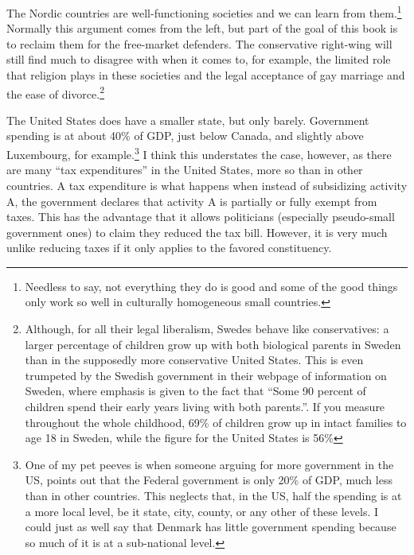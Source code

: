 The Nordic countries are well-functioning societies and we can learn from
them.\footnote{Needless to say, not everything they do is good and some of the
good things only work so well in culturally homogeneous small countries.}
Normally this argument comes from the left, but part of the goal of this book
is to reclaim them for the free-market defenders. The conservative right-wing
will still find much to disagree with when it comes to, for example, the
limited role that religion plays in these societies and the legal acceptance of
gay marriage and the ease of divorce.\footnote{Although, for all their legal
liberalism, Swedes behave like conservatives: a larger percentage of children
grow up with both biological parents in Sweden than in the supposedly more
conservative United States. This is even trumpeted by the Swedish government in
their webpage of information on Sweden, where emphasis is given to the fact
that ``Some 90 percent of children spend their early years living with both
parents.''.
If you measure throughout the whole childhood, 69\% of children grow up in
intact families to age 18 in Sweden, while the figure for the United States is
56\%}

The United States does have a smaller state, but only barely. Government
spending is at about 40\% of GDP, just below Canada, and slightly above
Luxembourg, for example.\footnote{One of my pet peeves is when someone arguing
for more government in the US, points out that the Federal government is only
20\% of GDP, much less than in other countries. This neglects that, in the US,
half the spending is at a more local level, be it state, city, county, or any
other of these levels. I could just as well say that Denmark has little
government spending because so much of it is at a sub-national level.} I think
this understates the case, however, as there are many ``tax expenditures'' in
the United States, more so than in other countries. A tax expenditure is what
happens when instead of subsidizing activity A, the government declares that
activity A is partially or fully exempt from taxes. This has the advantage that
it allows politicians (especially pseudo-small government ones) to claim they
reduced the tax bill. However, it is very much unlike reducing taxes if it only
applies to the favored constituency.

